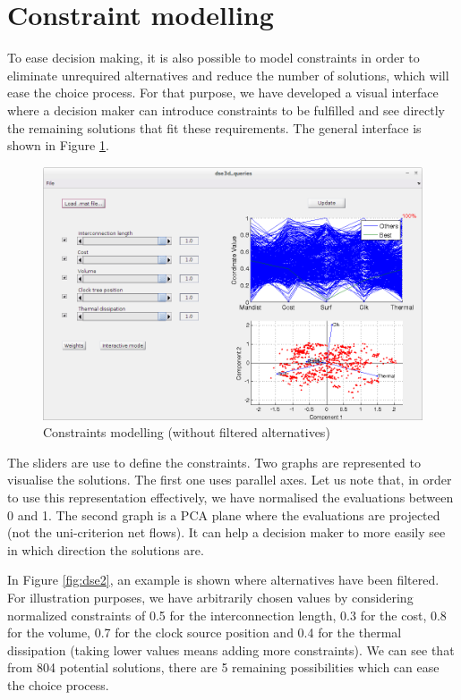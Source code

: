 \section{Constraint modelling}
To ease decision making, it is also possible to model constraints in order to eliminate unrequired alternatives and reduce the number of solutions, which will ease the choice process. For that purpose, we have developed a visual interface where a decision maker can introduce constraints to be fulfilled and see directly the remaining solutions that fit these requirements. The general interface is shown in Figure \ref{fig:dse1}.

\begin{figure}[h!]
\begin{center}
\includegraphics[width=\linewidth]{dseconstraints}
\end{center}
\caption{Constraints modelling (without filtered alternatives)}
\label{fig:dse1}
\end{figure}

The sliders are use to define the constraints. Two graphs are represented to visualise the solutions. The first one uses parallel axes. Let us note that, in order to use this representation effectively, we have normalised the evaluations between 0 and 1. The second graph is a PCA plane where the evaluations are projected (not the uni-criterion net flows). It can help a decision maker to more easily see in which direction the solutions are.

In Figure \ref{fig:dse2}, an example is shown where alternatives have been filtered. For illustration purposes, we have arbitrarily chosen values by considering normalized constraints of 0.5 for the interconnection length, 0.3 for the cost, 0.8 for the volume, 0.7 for the clock source position and 0.4 for the thermal dissipation (taking lower values means adding more constraints). We can see that from 804 potential solutions, there are 5 remaining possibilities which can ease the choice process.

